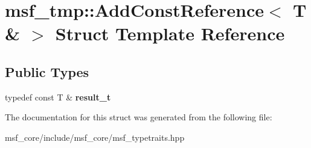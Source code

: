 \hypertarget{structmsf__tmp_1_1AddConstReference_3_01T_01_6_01_4}{\section{msf\-\_\-tmp\-:\-:Add\-Const\-Reference$<$ T \& $>$ Struct Template Reference}
\label{structmsf__tmp_1_1AddConstReference_3_01T_01_6_01_4}
}
\subsection*{Public Types}
\begin{DoxyCompactItemize}
\item 
\hypertarget{structmsf__tmp_1_1AddConstReference_3_01T_01_6_01_4_a93ed39fb491234523b8ca98e93ab2ed4}{typedef const T \& {\bfseries result\-\_\-t}}\label{structmsf__tmp_1_1AddConstReference_3_01T_01_6_01_4_a93ed39fb491234523b8ca98e93ab2ed4}

\end{DoxyCompactItemize}


The documentation for this struct was generated from the following file\-:\begin{DoxyCompactItemize}
\item 
msf\-\_\-core/include/msf\-\_\-core/msf\-\_\-typetraits.\-hpp\end{DoxyCompactItemize}
